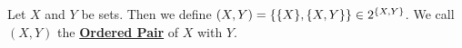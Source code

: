 \newcommand{\OrderedPair}[0]{\textbf{\hyperref[def:OrderedPair]{Ordered Pair}}\xspace}
\newcommand{\OrderedPairs}[0]{\textbf{\hyperref[def:OrderedPair]{Ordered Pairs}}\xspace}
\begin{df}
\label{def:OrderedPair}

\rm
    Let $X$ and $Y$ be sets. 
    Then we define 
    $(X,Y)= \{\{X\}, \{X, Y\}\} \in 2^{\{X, Y\}}$. 
    We call $(X,Y)$ the \OrderedPair of $X$ with $Y$. 
\end{df}
